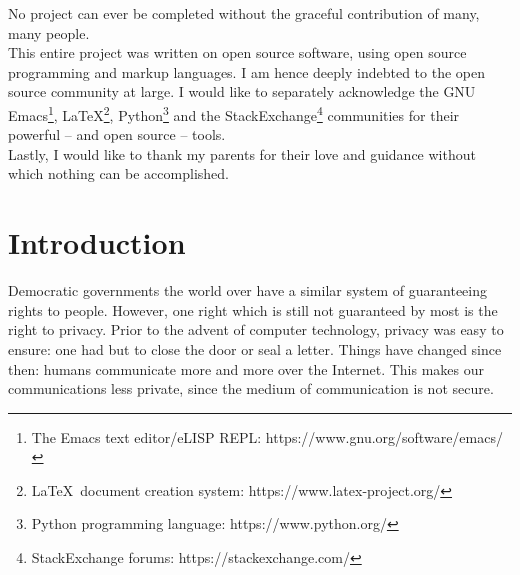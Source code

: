 \documentclass[titlepage]{article}
\begin{document}
No project can ever be completed without the graceful contribution of many, many people.\\


This entire project was written on open source software, using open source programming and markup
languages. I am hence deeply indebted to the open source community at large. I would like to
separately acknowledge the GNU Emacs\footnote{The Emacs text editor/eLISP REPL:
https://www.gnu.org/software/emacs/}, \LaTeX\footnote{\LaTeX\ document creation system:
https://www.latex-project.org/}, Python\footnote{Python programming language:
https://www.python.org/} and the StackExchange\footnote{StackExchange forums:
https://stackexchange.com/} communities for their powerful -- and open source -- tools.\\

Lastly, I would like to thank my parents for their love and guidance without which nothing can be
accomplished.

\cleardoublepage
\tableofcontents

\cleardoublepage
\listoffigures

\cleardoublepage
\renewcommand\listoflistingscaption{Source Code Listings}
\listoflistings
{}
\cleardoublepage

\section{Introduction}
Democratic governments the world over have a similar system of guaranteeing rights to people.
However, one right which is still not guaranteed by most is the right to privacy. Prior to the
advent of computer technology, privacy was easy to ensure: one had but to close the door or seal a letter.
Things have changed since then: humans communicate more and more over the Internet. This makes our
communications less private, since the medium of communication is not secure.
\end{document}
